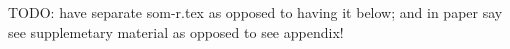 \documentclass[10pt, letterpaper]{article}
\begin{document}
\begin{spacing}{1.4}


    




TODO: have separate som-r.tex as opposed to having it below; and in paper say
see supplemetary material as opposed to see appendix!

\end{spacing}
\end{document}
